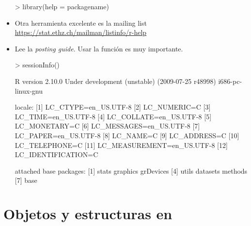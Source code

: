 \begin{frame}
\begin{itemize}
\begin{Schunk}
\begin{Sinput}
> library(help = packagename)
\end{Sinput}
\end{Schunk}
  \item Otra herramienta excelente es la  mailing list \url{https://stat.ethz.ch/mailman/listinfo/r-help}
  \item Lee la \emph{posting guide}. Usar la funci\'on  es muy importante. \scriptsize
\begin{Schunk}
\begin{Sinput}
> sessionInfo()
\end{Sinput}
\begin{Soutput}
R version 2.10.0 Under development (unstable) (2009-07-25 r48998) 
i686-pc-linux-gnu 

locale:
 [1] LC_CTYPE=en_US.UTF-8      
 [2] LC_NUMERIC=C              
 [3] LC_TIME=en_US.UTF-8       
 [4] LC_COLLATE=en_US.UTF-8    
 [5] LC_MONETARY=C             
 [6] LC_MESSAGES=en_US.UTF-8   
 [7] LC_PAPER=en_US.UTF-8      
 [8] LC_NAME=C                 
 [9] LC_ADDRESS=C              
[10] LC_TELEPHONE=C            
[11] LC_MEASUREMENT=en_US.UTF-8
[12] LC_IDENTIFICATION=C       

attached base packages:
[1] stats     graphics  grDevices
[4] utils     datasets  methods  
[7] base     
\end{Soutput}
\end{Schunk}
\normalsize
  \end{itemize}
\end{frame}

\section{Objetos y estructuras en }

